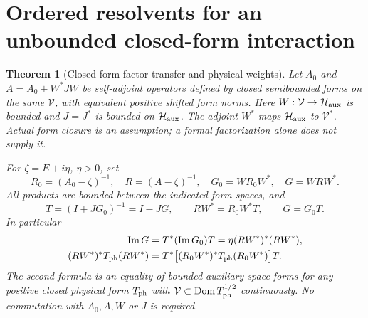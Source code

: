 \documentclass[11pt]{article}
\numberwithin{equation}{section}
\newtheorem{theorem}{Theorem}[section]
\theoremstyle{definition}
\theoremstyle{remark}
\begin{document}
\section{Ordered resolvents for an unbounded closed-form interaction}
\label{p4f:sec:ordered}

\begin{theorem}[Closed-form factor transfer and physical weights]
\label{p4f:thm:ordered}
Let $A_0$ and $A=A_0+W^*JW$ be self-adjoint operators
defined by closed semibounded forms on the same
$\mathcal V$, with equivalent positive shifted form norms.
Here $W:\mathcal V\to\mathcal H_{\rm aux}$ is bounded
and $J=J^*$ is bounded on $\mathcal H_{\rm aux}$.
The adjoint $W^*$ maps $\mathcal H_{\rm aux}$ to
$\mathcal V^*$. Actual form closure is an assumption;
a formal factorization alone does not supply it.

For $\zeta=E+i\eta$, $\eta>0$, set
\[
 R_0=(A_0-\zeta)^{-1},\quad R=(A-\zeta)^{-1},\quad
 G_0=WR_0W^*,\quad G=WRW^* .
\]
All products are bounded between the indicated form
spaces, and
\begin{equation}\label{p4f:eq:ordered}
 T=(I+JG_0)^{-1}=I-JG,\qquad
 RW^*=R_0W^*T,\qquad G=G_0T .
\end{equation}
In particular
\begin{align}
 \operatorname{Im}G
   &=T^*(\operatorname{Im}G_0)T
     =\eta(RW^*)^*(RW^*), \label{p4f:eq:imag}\\
 (RW^*)^*T_{\rm ph}(RW^*)
   &=T^*\big[(R_0W^*)^*T_{\rm ph}(R_0W^*)\big]T .
       \label{p4f:eq:physicalsandwich}
\end{align}
The second formula is an equality of bounded
auxiliary-space forms for any positive closed physical
form $T_{\rm ph}$ with
$\mathcal V\subset\operatorname{Dom}T_{\rm ph}^{1/2}$
continuously. No commutation with $A_0,A,W$ or $J$
is required.
\end{theorem}
\end{document}

